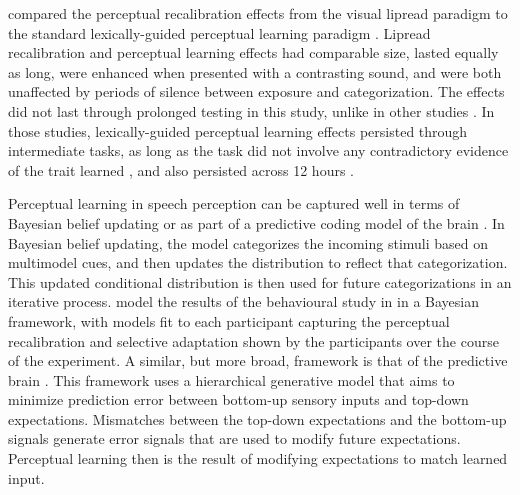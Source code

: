 \citet{vanLinden2007} compared the perceptual recalibration effects from the visual lipread paradigm \citep{Bertelson2003} to the standard lexically-guided perceptual learning paradigm \citep{Norris2003}.  
Lipread recalibration and perceptual learning effects had comparable size, lasted equally as long, were enhanced when presented with a contrasting sound, and were both unaffected by periods of silence between exposure and categorization.  
The effects did not last through prolonged testing in this study, unlike in other studies \citep{Kraljic2005,Eisner2006}.
In those studies, lexically-guided perceptual learning effects persisted through intermediate tasks, as long as the task did not involve any contradictory evidence of the trait learned \citep{Kraljic2005}, and also persisted across 12 hours \citep{Eisner2006}.

Perceptual learning in speech perception can be captured well in terms of Bayesian belief updating \citep{Kleinschmidt2011} or as part of a predictive coding model of the brain \citep{Clark2013}.  
In Bayesian belief updating, the model categorizes the incoming stimuli based on multimodel cues, and then updates the distribution to reflect that categorization.  
This updated conditional distribution is then used for future categorizations in an iterative process.  
\citet{Kleinschmidt2011} model the results of the behavioural study in \citet{Vroomen2007} in a Bayesian framework, with models fit to each participant capturing the perceptual recalibration and selective adaptation shown by the participants over the course of the experiment.  
A similar, but more broad, framework is that of the predictive brain \citep{Clark2013}. 
This framework uses a hierarchical generative model that aims to minimize prediction error between bottom-up sensory inputs and top-down expectations.  
Mismatches between the top-down expectations and the bottom-up signals generate error signals that are used to modify future expectations.  
Perceptual learning then is the result of modifying expectations to match learned input.

